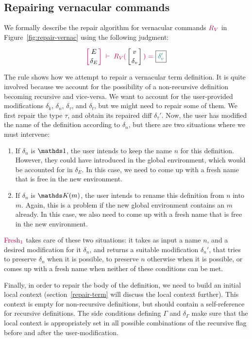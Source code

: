 \subsection{Repairing vernacular commands} \label{repair-vernacular}

We formally describe the repair algorithm for vernacular commands
$\textcolor{purple}{R_{V}}$ in Figure~\ref{fig:repair-vernac} using the following
judgment:

{
  \[
    {\turnstile
      {\denv{E}{\delta_E}}
      {\repairVernac{v}{\delta_v}{\delta_v'}}
    }
  \]
}

\noindent The rule  shows how we attempt to repair a
vernacular term definition.  It is quite involved because we account for the
possibility of a non-recursive definition becoming recursive and vice-versa.  We
want to account for the user-provided modifications $\delta_k$, $\delta_n$,
$\delta_\tau$, and $\delta_t$, but we might need to repair some of them.  We
first repair the type $\tau$, and obtain its repaired diff $\delta_\tau'$.  Now,
the user has modified the name of the definition according to $\delta_n$, but
there are two situations where we must intervene:

\begin{enumerate}

\item If $\delta_n$ is $\MathSame$, the user intends to keep the name $n$ for
this definition.  However, they could have introduced in the global environment,
which would be accounted for in $\delta_E$. In this case, we need to come up
with a fresh name that is free in the new environment.

\item If $\delta_n$ is $\MathReplace{m}$, the user intends to rename this
definition from $n$ into $m$.  Again, this is a problem if the new global
environment contains an $m$ already.  In this case, we also need to come up with
a fresh name that is free in the new environment.

\end{enumerate}

\noindent $\textcolor{purple}{\text{Fresh}_1}$ takes care of these two situations: it takes as input a
name $n$, and a desired modification for it $\delta_n$, and returns a suitable
modification $\delta_n'$, that tries to preserve $\delta_n$ when it is possible,
to preserve $n$ otherwise when it is possible, or comes up with a fresh name
when neither of these conditions can be met.

Finally, in order to repair the body of the definition, we need to build an
initial local context (section~\ref{repair-term} will discuss the local context
further).  This context is empty for non-recursive definitions, but should
contain a self-reference for recursive definitions.  The side conditions
defining $\Gamma$ and $\delta_\Gamma$ make sure that the local context is
appropriately set in all possible combinations of the recursive flag before and
after the user-modification.

